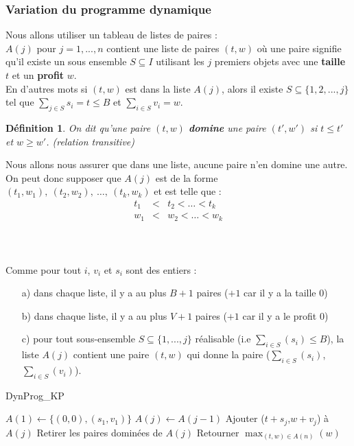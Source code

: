 \documentclass[12pt]{article}
\newtheorem{de}{D\'efinition}[section]
\begin{document}
\subsubsection{Variation du programme dynamique}

Nous allons utiliser un tableau de listes de paires : \\
$A(j)$ pour $j = 1,...,n$ contient une liste de paires $(t,w)$ où une paire signifie qu'il existe un sous ensemble $S\subseteq I$ utilisant
les $j$ premiers objets avec une \textbf{taille} $t$ et un \textbf{profit} $w$. \\
En d'autres mots si $(t,w)$ est dans la liste $A(j)$, alors il existe $S\subseteq \{1,2,...,j\}$ tel que $\sum_{j\in S} s_i = t \leq B$ et
$\sum_{i\in S} v_i = w$.

\begin{de}
On dit qu'une paire $(t,w)$ \textbf{domine} une paire $(t',w')$ si $t\leq t'$ et
$w \geq w'$. (relation transitive)
\end{de}

Nous allons nous assurer que dans une liste, aucune paire n'en domine une autre. On peut donc supposer que $A(j)$ est de la forme $(t_1,w_1),
\ (t_2,w_2),\ \ldots ,\ (t_k,w_k)$ et est telle que :
\begin{eqnarray}
\nonumber t_1 & < & t_2 < \ldots < t_k \\
\nonumber w_1 & < & w_2 < \ldots < w_k
\end{eqnarray}
$ $\\
$ $\\
$ $\\

\noindent Comme pour tout $i$, $v_i$ et $s_i$ sont des entiers :
\begin{enumerate}
\item[a)] dans chaque liste, il y a au plus $B+1$ paires ($+1$ car il y a la taille $0$)
\item[b)] dans chaque liste, il y a au plus $V+1$ paires ($+1$ car il y a le profit $0$)
\item[c)] pour tout sous-ensemble $S\subseteq \{1,...,j\}$ réalisable (i.e $\sum_{i\in S}(s_i) \leq B$), la liste $A(j)$ contient une paire
$(t,w)$ qui donne la paire ($\sum_{i\in S}(s_i)$,$\sum_{i\in S}(v_i)$).
\end{enumerate}

\begin{algorithm}[h!]
\caption{DynProg\_KP}
\begin{algorithmic}[1]
\STATE $A(1)\leftarrow \{(0,0),(s_1,v_1)\}$
\STATE $A(j)\leftarrow A(j-1)$
\STATE Ajouter ($t+s_j$,$w+v_j$) à $A(j)$
\ENDIF
\ENDFOR
\STATE Retirer les paires dominées de $A(j)$
\ENDFOR
\STATE Retourner $\max_{(t,w)\in A(n)}(w)$
\end{algorithmic}
\end{algorithm}
\end{document}
